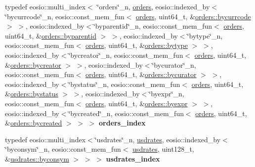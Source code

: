 \begin{DoxyCompactItemize}
typedef eosio\+::multi\+\_\+index$<$ \char`\"{}orders\char`\"{}\+\_\+n, \mbox{\hyperlink{structp2p_1_1orders}{orders}}, eosio\+::indexed\+\_\+by$<$\char`\"{}bycurrcode\char`\"{}\+\_\+n, eosio\+::const\+\_\+mem\+\_\+fun$<$ \mbox{\hyperlink{structp2p_1_1orders}{orders}}, uint64\+\_\+t, \&\mbox{\hyperlink{structp2p_1_1orders_ab6f05a725122c94d3f2dcfaf24322c47}{orders\+::bycurrcode}} $>$ $>$, eosio\+::indexed\+\_\+by$<$\char`\"{}byparentid\char`\"{}\+\_\+n, eosio\+::const\+\_\+mem\+\_\+fun$<$ \mbox{\hyperlink{structp2p_1_1orders}{orders}}, uint64\+\_\+t, \&\mbox{\hyperlink{structp2p_1_1orders_a2b790da517561e8a593b6c56d63c4cfd}{orders\+::byparentid}} $>$ $>$, eosio\+::indexed\+\_\+by$<$\char`\"{}bytype\char`\"{}\+\_\+n, eosio\+::const\+\_\+mem\+\_\+fun$<$ \mbox{\hyperlink{structp2p_1_1orders}{orders}}, uint64\+\_\+t, \&\mbox{\hyperlink{structp2p_1_1orders_a17505cc3759a5ba5099f490c982535e1}{orders\+::bytype}} $>$ $>$, eosio\+::indexed\+\_\+by$<$\char`\"{}bycreator\char`\"{}\+\_\+n, eosio\+::const\+\_\+mem\+\_\+fun$<$ \mbox{\hyperlink{structp2p_1_1orders}{orders}}, uint64\+\_\+t, \&\mbox{\hyperlink{structp2p_1_1orders_a91b49c417f79ef405982bfe348651a98}{orders\+::bycreator}} $>$ $>$, eosio\+::indexed\+\_\+by$<$\char`\"{}bycurator\char`\"{}\+\_\+n, eosio\+::const\+\_\+mem\+\_\+fun$<$ \mbox{\hyperlink{structp2p_1_1orders}{orders}}, uint64\+\_\+t, \&\mbox{\hyperlink{structp2p_1_1orders_a76fa8b54f391ccd2e29b640d4c0199df}{orders\+::bycurator}} $>$ $>$, eosio\+::indexed\+\_\+by$<$\char`\"{}bystatus\char`\"{}\+\_\+n, eosio\+::const\+\_\+mem\+\_\+fun$<$ \mbox{\hyperlink{structp2p_1_1orders}{orders}}, uint64\+\_\+t, \&\mbox{\hyperlink{structp2p_1_1orders_a31e70a285fb324d4ee07b1b149debff3}{orders\+::bystatus}} $>$ $>$, eosio\+::indexed\+\_\+by$<$\char`\"{}byexpr\char`\"{}\+\_\+n, eosio\+::const\+\_\+mem\+\_\+fun$<$ \mbox{\hyperlink{structp2p_1_1orders}{orders}}, uint64\+\_\+t, \&\mbox{\hyperlink{structp2p_1_1orders_a8cf94dfb0902511c6baae1dd0434dcbf}{orders\+::byexpr}} $>$ $>$, eosio\+::indexed\+\_\+by$<$\char`\"{}bycreated\char`\"{}\+\_\+n, eosio\+::const\+\_\+mem\+\_\+fun$<$ \mbox{\hyperlink{structp2p_1_1orders}{orders}}, uint64\+\_\+t, \&\mbox{\hyperlink{structp2p_1_1orders_a6eab9cb4d0f7b605aef8856aad730fe5}{orders\+::bycreated}} $>$ $>$ $>$ {\bfseries orders\+\_\+index}
\item 
\mbox{\label{classp2p_ac0dc7fa780d52c554aea91ab34bb3cfb}} 
typedef eosio\+::multi\+\_\+index$<$\char`\"{}usdrates\char`\"{}\+\_\+n, \mbox{\hyperlink{structp2p_1_1usdrates}{usdrates}}, eosio\+::indexed\+\_\+by$<$ \char`\"{}byconsym\char`\"{}\+\_\+n, eosio\+::const\+\_\+mem\+\_\+fun$<$ \mbox{\hyperlink{structp2p_1_1usdrates}{usdrates}}, uint128\+\_\+t, \&\mbox{\hyperlink{structp2p_1_1usdrates_a6d13bdd9e62d26ca68146e642e330099}{usdrates\+::byconsym}} $>$ $>$ $>$ {\bfseries usdrates\+\_\+index}

\end{DoxyCompactItemize}
